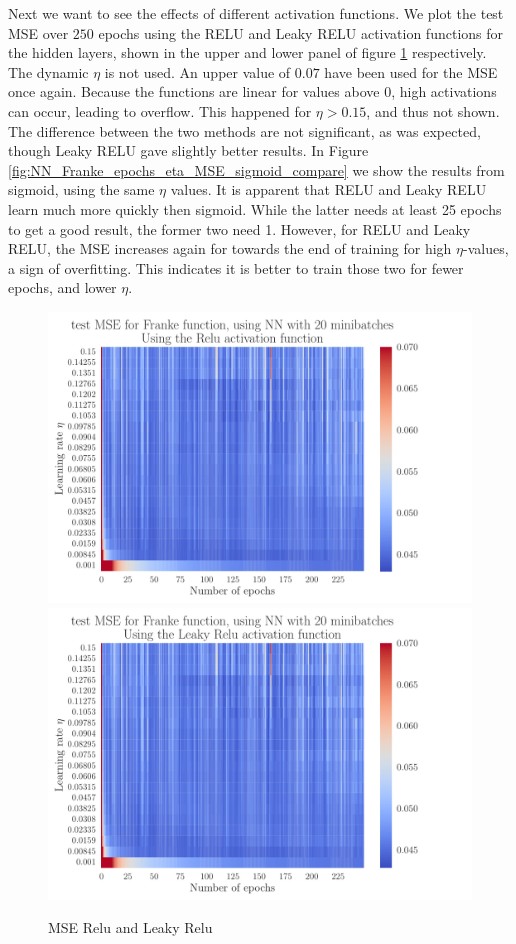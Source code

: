 \documentclass[12pt]{extarticle}
\begin{document}
Next we want to see the effects of different activation functions. We plot the test MSE over $250$ epochs using the RELU and Leaky RELU activation functions for the hidden layers, shown in the upper and lower panel of figure \ref{fig:NN_Franke_epochs_eta_MSE_relu_leaky} respectively. The dynamic $\eta$ is not used. An upper value of $0.07$ have been used for the MSE once again. Because the functions are linear for values above $0$, high activations can occur, leading to overflow. This happened for $\eta>0.15$, and thus not shown.  The difference between the two methods are not significant, as was expected, though Leaky RELU gave slightly better results. In Figure \ref{fig:NN_Franke_epochs_eta_MSE_sigmoid_compare} we show the results from sigmoid, using the same $\eta$ values. It is apparent that RELU and Leaky RELU learn much more quickly then sigmoid. While the latter needs at least 25 epochs to get a good result, the former two need 1. However, for RELU and Leaky RELU, the MSE increases again for towards the end of training for high $\eta$-values, a sign of overfitting. This indicates it is better to train those two for fewer epochs, and lower $\eta$.

\begin{figure}[h!]
	\includegraphics[width=0.8\linewidth]{NN_Franke/NN_Franke__epochs_eta__test_MSE__relu__733938.pdf}
	\includegraphics[width=0.8\linewidth]{NN_Franke/NN_Franke__epochs_eta__test_MSE__leaky_relu__501404.pdf}
	\caption{MSE Relu and Leaky Relu}
	\label{fig:NN_Franke_epochs_eta_MSE_relu_leaky}
\end{figure}
\end{document}
